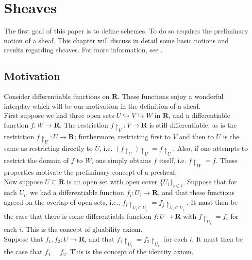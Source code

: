 \documentclass[11pt,openany]{book} %
\newcommand{\R}{\mathbf{R}}
\begin{document}
\chapter{Sheaves} \label{sheaves}

The first goal of this paper is to define schemes. To do so requires the preliminary notion of a sheaf. This chapter will discuss in detail some basic notions and results regarding sheaves. For more information, see \cite{vakil}.


\section{Motivation}

Consider differentiable functions on $\R$. These functions enjoy a wonderful interplay which will be our motivation in the definition of a sheaf.\\ 

First suppose we had three open sets $U \hookrightarrow V \hookrightarrow W$ in $\R$, and a differentiable function $f : W \to \R$. The restriction $f\restriction_V : V \to \R$ is still differentiable, as is the restriction $f\restriction_U : U \to \R$; furthermore, restricting first to $V$ and then to $U$ is the same as restricting directly to $U$, i.e. $(f\restriction_V)\restriction_U = f\restriction_U$. Also, if one attempts to restrict the domain of $f$ to $W$, one simply obtains $f$ itself, i.e. $f\restriction_W = f$. These properties motivate the preliminary concept of a presheaf.\\

Now suppose $U \subseteq \R$ is an open set with open cover $\{U_i\}_{i \in I}$. Suppose that for each $U_i$, we had a differentiable function $f_i : U_i \to \R$, and that these functions agreed on the overlap of open sets, i.e., $f_i\restriction_{U_i \cap U_j} = f_j \restriction_{U_i \cap U_j}$. It must then be the case that there is some differentiable function $f : U \to \R$ with $f\restriction_{U_i} = f_i$ for each $i$. This is the concept of gluability axiom.\\

Suppose that $f_1, f_2 : U \to \R$, and that $f_1\restriction_{U_i} = f_2\restriction_{U_i}$ for each $i$. It must then be the case that $f_1 = f_2$. This is the concept of the identity axiom.\\
\end{document}

